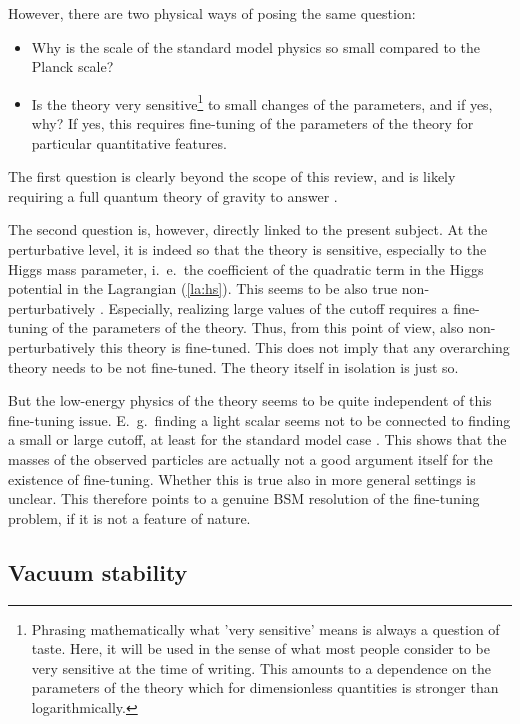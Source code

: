 \documentclass[final,twoside,12pt]{article}
\newcommand*{\pref}[1]{(\ref{#1})}
\newcommand*{\1}{1\!\!\!\bot}
\begin{document}
However, there are two physical ways of posing the same question:
\begin{itemize}
 \item Why is the scale of the standard model physics so small compared to the Planck scale?
 \item Is the theory very sensitive\footnote{Phrasing mathematically what 'very sensitive' means is always a question of taste. Here, it will be used in the sense of what most people consider to be very sensitive at the time of writing. This amounts to a dependence on the parameters of the theory which for dimensionless quantities is stronger than logarithmically.} to small changes of the parameters, and if yes, why? If yes, this requires fine-tuning of the parameters of the theory for particular quantitative features.
\end{itemize}
The first question is clearly beyond the scope of this review, and is likely requiring a full quantum theory of gravity to answer \cite{Shaposhnikov:2009pv,Dona:2013qba,Eichhorn:2016esv,Litim:2011qf}.

The second question is, however, directly linked to the present subject. At the perturbative level, it is indeed so \cite{Feng:2013pwa,Callaway:1988ya,Morrissey:2009tf} that the theory is sensitive, especially to the Higgs mass parameter, i.\ e.\ the coefficient of the quadratic term in the Higgs potential in the Lagrangian \pref{la:hs}. This seems to be also true non-perturbatively \cite{Maas:2014pba,Gies:2015lia,Gies:2016kkk}. Especially, realizing large values of the cutoff requires a fine-tuning of the parameters of the theory. Thus, from this point of view, also non-perturbatively this theory is fine-tuned. This does not imply that any overarching theory needs to be not fine-tuned. The theory itself in isolation is just so.

But the low-energy physics of the theory seems to be quite independent of this fine-tuning issue. E.\ g.\ finding a light scalar seems not to be connected to finding a small or large cutoff, at least for the standard model case \cite{Maas:2014pba}. This shows that the masses of the observed particles are actually not a good argument itself for the existence of fine-tuning. Whether this is true also in more general settings is unclear. This therefore points to a genuine BSM resolution of the fine-tuning problem, if it is not a feature of nature.

\subsection{Vacuum stability}\label{ss:vs}
\end{document}
